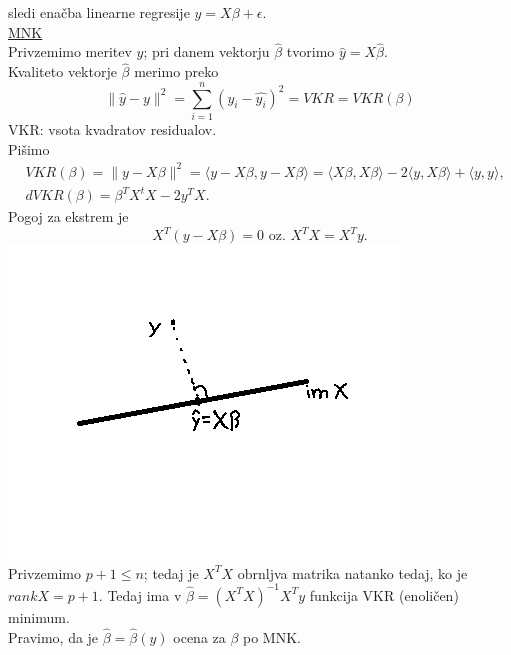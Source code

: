\documentclass[a4paper, 12pt]{book}
\theoremstyle{definition}
\theoremstyle{remark}
\begin{document}
sledi enačba linearne regresije $y = X \beta + \epsilon$. \\
\underline{MNK} \\
Privzemimo meritev $y$;
pri danem vektorju $\hat{\beta}$ tvorimo  $\hat{y} = X \hat{\beta}$. \\
Kvaliteto vektorje $\hat{\beta}$ merimo preko
\begin{equation*}
  \lVert \hat{y} - y \rVert^2 = \sum_{i=1}^{n} (y_i - \hat{y_i})^2 = VKR = VKR(\beta)
\end{equation*}
VKR: vsota kvadratov residualov. \\
Pišimo
\begin{align*}
  &VKR(\beta) = \lVert y - X \beta \rVert^2 = \langle y - X \beta, y - X \beta\rangle
    = \langle X \beta, X \beta \rangle - 2\langle y, X \beta\rangle + \langle y, y\rangle, \\
  &dVKR(\beta) = \beta^T X^t X - 2 y^T X.
\end{align*}
Pogoj za ekstrem je
\begin{equation*}
  X^T (y - X \beta) = 0 \text{ oz. } X^T X = X^T y.
\end{equation*}
\includegraphics[scale=0.4]{projekcija_4_3} \\
Privzemimo $p+1 \leq n$; tedaj je $X^T X$ obrnljva matrika natanko tedaj,
ko je $rank X = p+1$.
Tedaj ima v $\hat{\beta} = (X^T X)^{-1} X^T y$ funkcija VKR (enoličen) minimum. \\
Pravimo, da je $\hat{\beta} = \hat{\beta}(y)$ ocena za $\beta$ po MNK.



%
%



\end{document}
